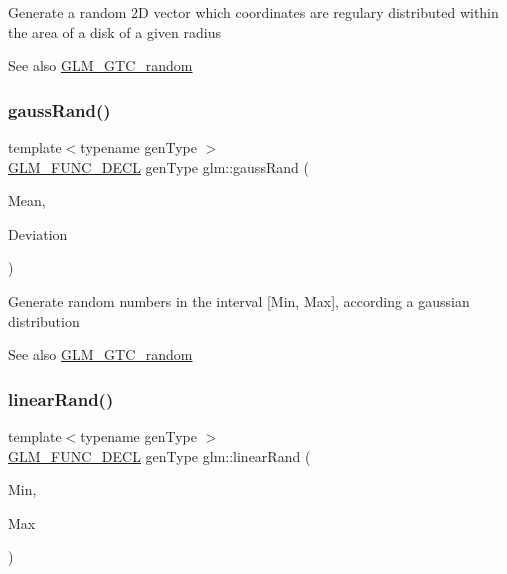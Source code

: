 Generate a random 2D vector which coordinates are regulary distributed within the area of a disk of a given radius

\begin{DoxySeeAlso}{See also}
\hyperlink{group__gtc__random}{G\+L\+M\+\_\+\+G\+T\+C\+\_\+random} 
\end{DoxySeeAlso}
\mbox{\label{group__gtc__random_ga5193a83e49e4fdc5652c084711083574}} 
\subsubsection{\texorpdfstring{gauss\+Rand()}{gaussRand()}}
{\footnotesize\ttfamily template$<$typename gen\+Type $>$ \\
\hyperlink{setup_8hpp_ab2d052de21a70539923e9bcbf6e83a51}{G\+L\+M\+\_\+\+F\+U\+N\+C\+\_\+\+D\+E\+CL} gen\+Type glm\+::gauss\+Rand (\begin{DoxyParamCaption}\item[{gen\+Type}]{Mean,  }\item[{gen\+Type}]{Deviation }\end{DoxyParamCaption})}

Generate random numbers in the interval \mbox{[}Min, Max\mbox{]}, according a gaussian distribution

\begin{DoxySeeAlso}{See also}
\hyperlink{group__gtc__random}{G\+L\+M\+\_\+\+G\+T\+C\+\_\+random} 
\end{DoxySeeAlso}
\mbox{\label{group__gtc__random_ga04e241ab88374a477a2c2ceadd2fa03d}} 
\subsubsection{\texorpdfstring{linear\+Rand()}{linearRand()}\hspace{0.1cm}{\footnotesize\ttfamily [1/2]}}
{\footnotesize\ttfamily template$<$typename gen\+Type $>$ \\
\hyperlink{setup_8hpp_ab2d052de21a70539923e9bcbf6e83a51}{G\+L\+M\+\_\+\+F\+U\+N\+C\+\_\+\+D\+E\+CL} gen\+Type glm\+::linear\+Rand (\begin{DoxyParamCaption}\item[{gen\+Type}]{Min,  }\item[{gen\+Type}]{Max }\end{DoxyParamCaption})}

